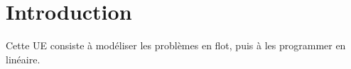 \section{Introduction}
Cette UE consiste à modéliser les problèmes en flot,
puis à les programmer en linéaire.
